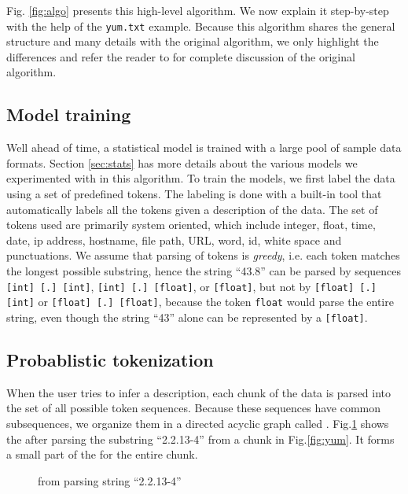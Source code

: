 Fig. \ref{fig:algo} presents this high-level algorithm. We now explain
it step-by-step with the help of the {\tt yum.txt} example.
Because this algorithm shares the general structure and many details with
the original algorithm, we only highlight the differences and
refer the reader to \cite{fisher+:dirttoshovels} for complete discussion of
the original algorithm.

\subsection{Model training}
Well ahead of time, a statistical model is trained with
a large pool of sample data formats. Section \ref{sec:stats} has more details
about the various models we experimented with in this algorithm. To train the models,
we first label the data using a set of predefined tokens. The labeling
is done with a built-in tool that automatically labels all the tokens
given a \pads{} description of the data. The set of tokens
used are primarily system oriented, which include
integer, float, time, date, ip address, hostname, file path, URL, 
word, id, white space and punctuations. 
We assume that parsing of tokens is {\em greedy}, i.e.
each token matches the longest possible substring, hence
the string ``43.8'' can be parsed by sequences 
{\tt [int] [.] [int]}, {\tt [int] [.] [float]}, or {\tt [float]},
but not by {\tt [float] [.] [int]} or {\tt [float] [.] [float]},
because the token {\tt float} would parse the entire string, even though
the string ``43'' alone can be represented by a {\tt [float]}.

\subsection{Probablistic tokenization}
When the user tries to infer a description, each chunk of the data 
is parsed into the set of all possible token sequences. 
Because these sequences have
common subsequences, we organize them in a directed acyclic graph
called \seqset. Fig.\ref{fig:seqset} shows the \seqset{} after parsing 
the substring ``2.2.13-4'' from a chunk in Fig.\ref{fig:yum}. It 
forms a small part of the \seqset{} for the entire chunk.

\begin{figure}[th]
\begin{center}
\end{center}
\caption{\seqset{} from parsing string ``2.2.13-4''}\label{fig:seqset}
\end{figure}

